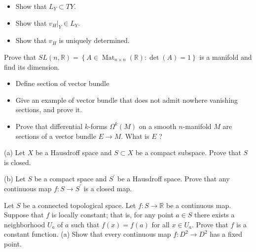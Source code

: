 \documentclass[10pt]{article}
\begin{document}
\begin{itemize}
  \item Show that $L_{Y} \subset T Y$.

  \item Show that $\left.v_{H}\right|_{Y} \in L_{Y}$.

  \item Show that $v_{H}$ is uniquely determined.

\end{itemize}
\newpage
 Prove that $S L(n, \mathbb{R})=\left\{A \in \operatorname{Mat}_{n \times n}(\mathbb{R}): \operatorname{det}(A)=1\right\}$ is a manifold and find its dimension.
\newpage
\begin{itemize}
\item Define section of vector bundle


  \item Give an example of vector bundle that does not admit nowhere vanishing sections, and prove it.

  \item Prove that differential $k$-forms $\Omega^{k}(M)$ on a smooth $n$-manifold $M$ are sections of a vector bundle $E \rightarrow M$. What is $E$ ?

\end{itemize}


\newpage
(a) Let $X$ be a Hausdroff space and $S \subset X$ be a compact subspace. Prove that $S$ is closed.

(b) Let $S$ be a compact space and $S^{\prime}$ be a Hausdroff space. Prove that any continuous map $f: S \rightarrow S^{\prime}$ is a closed map.

\newpage
Let $S$ be a connected topological space. Let $f: S \rightarrow \mathbb{R}$ be a continuous map. Suppose that $f$ is locally constant; that is, for any point $a \in S$ there exists a neighborhood $U_{a}$ of $a$ such that $f(x)=f(a)$ for all $x \in U_{a}$. Prove that $f$ is a constant function.
(a) Show that every continuous map $f: D^{2} \rightarrow D^{2}$ has a fixed point.
\end{document}
